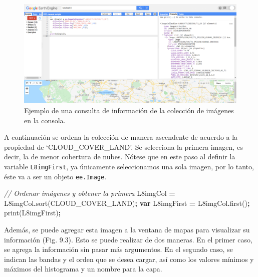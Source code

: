 \documentclass[
  12pt,
  letterpaper,
  twoside]{book}
\newenvironment{Shaded}{\begin{snugshade}}{\end{snugshade}}
\newcommand{\CommentTok}[1]{\textcolor[rgb]{0.56,0.35,0.01}{\textit{#1}}}
\newcommand{\FunctionTok}[1]{\textcolor[rgb]{0.00,0.00,0.00}{#1}}
\newcommand{\KeywordTok}[1]{\textcolor[rgb]{0.13,0.29,0.53}{\textbf{#1}}}
\newcommand{\NormalTok}[1]{#1}
\newcommand{\OperatorTok}[1]{\textcolor[rgb]{0.81,0.36,0.00}{\textbf{#1}}}
\newcommand{\StringTok}[1]{\textcolor[rgb]{0.31,0.60,0.02}{#1}}
\begin{document}
\begin{figure}[btp]

{\centering \includegraphics[width=1\linewidth]{Img/CamposImgCol} 

}

\caption{Ejemplo de una consulta de información de la colección de imágenes en la consola.}\label{fig:unnamed-chunk-147}
\end{figure}

A continuación se ordena la colección de manera ascendente de acuerdo a la propiedad de `CLOUD\_COVER\_LAND'. Se selecciona la primera imagen, es decir, la de menor cobertura de nubes. Nótese que en este paso al definir la variable \texttt{L8imgFirst}, ya únicamente seleccionamos una sola imagen, por lo tanto, éste va a ser un objeto \texttt{ee.Image}.

\begin{Shaded}
\begin{Highlighting}[]
\CommentTok{// Ordenar imágenes y obtener la primera}
\NormalTok{L8imgCol }\OperatorTok{=}\NormalTok{ L8imgCol}\OperatorTok{.}\FunctionTok{sort}\NormalTok{(}\StringTok{\textquotesingle{}CLOUD\_COVER\_LAND\textquotesingle{}}\NormalTok{)}\OperatorTok{;}
\KeywordTok{var}\NormalTok{ L8imgFirst }\OperatorTok{=}\NormalTok{ L8imgCol}\OperatorTok{.}\FunctionTok{first}\NormalTok{()}\OperatorTok{;} 
\FunctionTok{print}\NormalTok{(L8imgFirst)}\OperatorTok{;}
\end{Highlighting}
\end{Shaded}

Además, se puede agregar esta imagen a la ventana de mapas para visualizar su información (Fig. 9.3). Esto se puede realizar de dos maneras. En el primer caso, se agrega la información sin pasar más argumentos. En el segundo caso, se indican las bandas y el orden que se desea cargar, así como los valores mínimos y máximos del histograma y un nombre para la capa.
\end{document}
